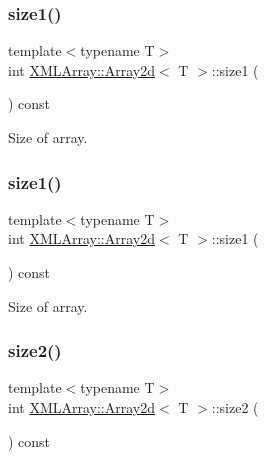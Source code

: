 \subsubsection{\texorpdfstring{size1()}{size1()}\hspace{0.1cm}{\footnotesize\ttfamily [2/3]}}
{\footnotesize\ttfamily template$<$typename T$>$ \\
int \mbox{\hyperlink{classXMLArray_1_1Array2d}{X\+M\+L\+Array\+::\+Array2d}}$<$ T $>$\+::size1 (\begin{DoxyParamCaption}{ }\end{DoxyParamCaption}) const\hspace{0.3cm}{\ttfamily [inline]}}



Size of array. 

\mbox{\label{classXMLArray_1_1Array2d_a0f5dd764b391ddffd3d89c71bbc6c614}} 
\subsubsection{\texorpdfstring{size1()}{size1()}\hspace{0.1cm}{\footnotesize\ttfamily [3/3]}}
{\footnotesize\ttfamily template$<$typename T$>$ \\
int \mbox{\hyperlink{classXMLArray_1_1Array2d}{X\+M\+L\+Array\+::\+Array2d}}$<$ T $>$\+::size1 (\begin{DoxyParamCaption}{ }\end{DoxyParamCaption}) const\hspace{0.3cm}{\ttfamily [inline]}}



Size of array. 

\mbox{\label{classXMLArray_1_1Array2d_a76f5ee9f75435c61089021f8cfbb6bf8}} 
\subsubsection{\texorpdfstring{size2()}{size2()}\hspace{0.1cm}{\footnotesize\ttfamily [1/3]}}
{\footnotesize\ttfamily template$<$typename T$>$ \\
int \mbox{\hyperlink{classXMLArray_1_1Array2d}{X\+M\+L\+Array\+::\+Array2d}}$<$ T $>$\+::size2 (\begin{DoxyParamCaption}{ }\end{DoxyParamCaption}) const\hspace{0.3cm}{\ttfamily [inline]}}

